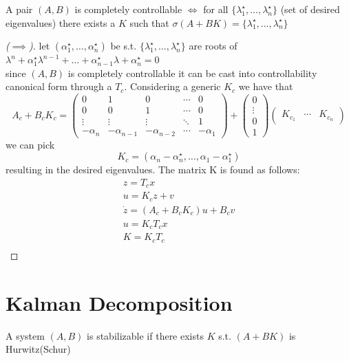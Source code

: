 \documentclass[english]{lectures}
\begin{document}
\begin{theorem}
    A pair $(A,B)$ is completely controllable $\iff$ for all \(\{\lambda_1^{\star},\dots,\lambda_n^{\star}\}\) (set of desired eigenvalues) there exists a $K$ such that $\sigma(A+BK)=\{\lambda_1^{\star},\dots,\lambda_n^{\star}\}$
\end{theorem}
\begin{proof}[($\implies$)]
    let $(\alpha_1^{\star},\dots,\alpha_n^{\star})$ be s.t. $\{\lambda_1^{\star},\dots,\lambda_n^{\star}\}$ are roots of $\lambda^n+\alpha_1^{\star}\lambda^{n-1}+\dots+\alpha_{n-1}^{\star}\lambda +\alpha_n^{\star}=0$ \\
    since $(A,B)$ is completely controllable it can be cast into controllability canonical form through a $T_c$. Considering a generic $K_c$ we have that
    \[
    A_c+B_cK_c=\begin{pmatrix}
    0 & 1 & 0 & \cdots & 0 \\
    0 & 0  & 1 & \cdots & 0 \\
    \vdots & \vdots & \vdots & \ddots & 1\\
    -\alpha_n & -\alpha_{n-1} & -\alpha_{n-2}& \cdots & -\alpha_1
\end{pmatrix} +\begin{pmatrix}
    0 \\ \vdots \\ 0 \\1
\end{pmatrix} \begin{pmatrix}
    K_{c_1} & \cdots & K_{c_n}
\end{pmatrix}
    \]
    we can pick
        \[
    K_c=(\alpha_n-\alpha_n^{\star},\dots,\alpha_1-\alpha_1^{\star})
    \]
    resulting in the desired eigenvalues. The matrix K is found as follows:
    \begin{gather*}
        z=T_cx \\
        u=K_cz+v \\
        \dot{z}=(A_c+B_cK_c)u+B_cv \\
        u=K_cT_cx \\
        K=K_cT_c \\
    \end{gather*}
    
\end{proof}

\section{Kalman Decomposition}
\begin{definition}
    A system $(A,B)$ is stabilizable if there exists $K$ s.t. $(A+BK)$ is Hurwitz(Schur)
\end{definition}
\end{document}
